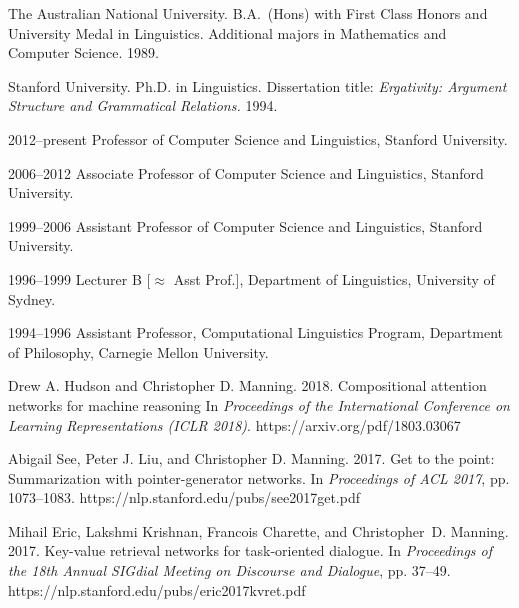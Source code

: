 \documentclass[11pt,letterpaper]{article}
\def\url#1{{\small\sf #1}}
\begin{document}
\begin{vita}
\begin{Professional Preparation}
\item The Australian National University. B.A.\ (Hons) with First Class Honors and University
Medal in Linguistics. Additional majors in Mathematics and Computer
Science. 1989.

\item Stanford University. Ph.D. in Linguistics.
Dissertation title: {\em Ergativity: Argument Structure and Grammatical
Relations.} 1994.

\end{Professional Preparation}

\begin{Appointments}[1996--present]
\item[2012--present] Professor of Computer Science and Linguistics,
  Stanford University.
\item[2006--2012] Associate Professor of Computer Science and
Linguistics, Stanford University.
\item[1999--2006] Assistant Professor of Computer Science and
Linguistics, Stanford University.
\item[1996--1999] Lecturer B [$\approx$ Asst Prof.], %
Department of Linguistics, University of Sydney. 
\item[1994--1996] Assistant Professor,
Computational Linguistics
Program, Department of Philosophy, Carnegie Mellon University.
\end{Appointments}

\begin{Products (most closely related)}

\item Drew A. Hudson and Christopher D. Manning. 2018. 
Compositional attention networks for machine reasoning
In {\em Proceedings of the International Conference on Learning
  Representations (ICLR 2018)}.
\url{https://arxiv.org/pdf/1803.03067}

\item Abigail See, Peter J. Liu, and Christopher D. Manning. 2017. Get
  to the point: Summarization with pointer-generator networks. In
  \emph{Proceedings of ACL 2017}, pp. 1073--1083.
\url{https://nlp.stanford.edu/pubs/see2017get.pdf}

\item Mihail Eric, Lakshmi Krishnan, Francois Charette, and Christopher~D. Manning.
2017.
Key-value retrieval networks for task-oriented dialogue.
In {\em Proceedings of the 18th Annual SIGdial Meeting on Discourse and Dialogue}, pp. 37--49.
\url{https://nlp.stanford.edu/pubs/eric2017kvret.pdf}


\end{Products (most closely related)}
\end{vita}
\end{document}
